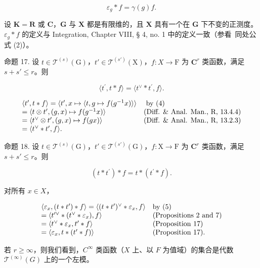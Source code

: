 \[
\varepsilon_ {g} * f = \gamma (g) f.
\]

设 \(\mathbf{K} = \mathbf{R}\) 或 \(\mathbf{C}\)，\(\mathbf{G}\) 与 \(\mathbf{X}\) 都是有限维的，且 \(\mathbf{X}\) 具有一个在 \(\mathbf{G}\) 下不变的正测度。\(\varepsilon_g * f\) 的定义与 Integration, Chapter VIII, § 4, no. 1 中的定义一致（参看~同处公式 (2)）。

命题 17. 设 \(t \in \mathcal{T}^{(s)}(\mathrm{G})\)，\(t' \in \mathcal{T}^{(s')}(\mathrm{X})\)，\(f: X \to \mathrm{F}\) 为 \(\mathbf{C}^{r}\) 类函数，满足 \(s + s' \leqslant r\)。则

\[
\langle t ^ {\prime}, t * f \rangle = \langle t ^ {\vee} * t ^ {\prime}, f \rangle .
\]

\[
\begin{array}{l l} \langle t ^ {\prime}, t * f \rangle = \langle t ^ {\prime}, x \mapsto \langle t, g \mapsto f (g ^ {- 1} x) \rangle \rangle & \text { by   (4) } \\ = \langle t \otimes t ^ {\prime}, (g, x) \mapsto f (g ^ {- 1} x) \rangle & \text {(Diff. \& Anal. Man., R, 13.4.4)} \\ = \langle t ^ {\vee} \otimes t ^ {\prime}, (g, x) \mapsto f (g x) \rangle & \text {(Diff. \& Anal. Man., R, 13.2.3)} \\ = \langle t ^ {\vee} * t ^ {\prime}, f \rangle . \end{array}
\]

命题 18. 设 \(t \in \mathcal{T}^{(s)}(\mathrm{G})\)，\(t' \in \mathcal{T}^{(s')}(\mathrm{G})\)，\(f: \mathrm{X} \to \mathrm{F}\) 为 \(\mathbf{C}^r\) 类函数，满足 \(s + s' \leqslant r\)。则

\[
(t * t ^ {\prime}) * f = t * (t ^ {\prime} * f).
\]

对所有 \(x \in X\)，

\[
\begin{array}{l l} \langle \varepsilon_ {x}, (t * t ^ {\prime}) * f \rangle = \langle (t * t ^ {\prime}) ^ {\vee} * \varepsilon_ {x}, f \rangle & \text {by (5)} \\ = \langle t ^ {\prime \vee} * (t ^ {\vee} * \varepsilon_ {x}), f \rangle & \text {(Propositions 2 and 7)} \\ = \langle t ^ {\vee} * \varepsilon_ {x}, t ^ {\prime} * f \rangle & \text {(Proposition 17)} \\ = \langle \varepsilon_ {x}, t * (t ^ {\prime} * f) \rangle & \text {(Proposition 17).} \end{array}
\]

若 \(r \geqslant \infty\)，则我们看到，\(C^\infty\) 类函数（\(X\) 上、以 \(F\) 为值域）的集合是代数 \(\mathcal{T}^{(\infty)}(G)\) 上的一个左模。

